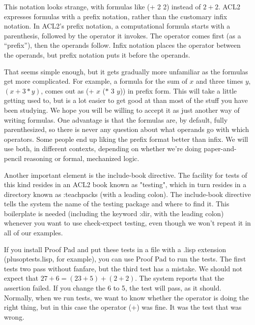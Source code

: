This notation looks strange, with formulas like \textsf{(+ 2 2)} instead of $2 + 2$.
ACL2 expresses formulas with a
prefix notation,
rather than the customary infix notation.
In ACL2's prefix notation, a computational
formula starts with a parenthesis,
followed by the operator it invokes.
The operator comes first (as a ``prefix''), then the operands follow.
Infix notation places the operator between the operands,
but prefix notation puts it before the operands.

That seems simple enough, but it gets gradually more unfamiliar
as the formulas get more complicated.
For example, a formula for the sum of $x$ and three times $y$, $(x + 3*y)$,
comes out as \textsf{(+ $x$ ($*$ 3 $y$))} in prefix form.
This will take a little getting used to,
but is a lot easier to get good at than
most of the stuff you have been studying.
We hope you will be willing to accept it as just another way of writing formulas.
One advantage is that the formulas are, by default, fully parenthesized,
so there is never any question about what operands go with which operators.
Some people end up liking the prefix format better than infix.
We will use both, in different contexts, depending on whether
we're doing paper-and-pencil reasoning or formal, mechanized logic.

Another important element is the
\textsf{include-book}
directive.
The facility for tests of this kind resides in an ACL2 book
known as "\textsf{testing}", which in turn resides in a directory known
as
\textsf{:teachpacks} (with a leading colon).
The \textsf{include-book} directive tells the system
the name of the testing package and where to find it.
This boilerplate is needed (including the keyword \textsf{:dir}, with the leading colon)
whenever you want to use \textsf{check-expect} testing,
even though we won't repeat it in all of our examples. %

If you install Proof Pad and put these tests in a file
with a .lisp extension (plusoptests.lisp, for example),
you can use Proof Pad to run the tests.
The first tests two pass without fanfare,
but the third test has a mistake.
We should not expect that $27 + 6 = (23 + 5) + (2 + 2)$.
The system reports that the assertion failed.
If you change the 6 to 5, the test will pass, as it should.
Normally, when we run tests, we want to know whether the
operator is doing the right thing,
but in this case the operator (\textsf{+}) was fine.
It was the test that was wrong.


